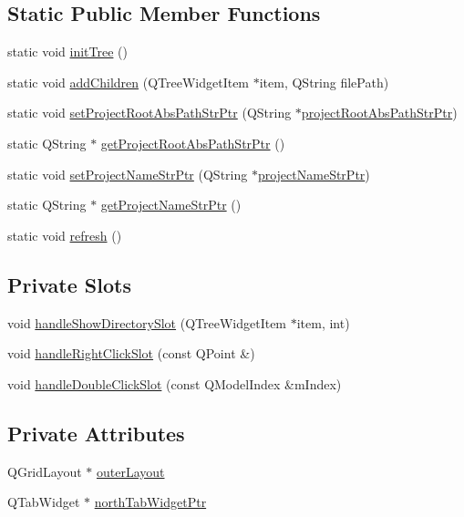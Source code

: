 \subsection*{Static Public Member Functions}
\begin{DoxyCompactItemize}
\item 
static void \hyperlink{class_file_tree_gui_a5d4df4a19da0183ccc254019f77097b1}{init\-Tree} ()
\item 
static void \hyperlink{class_file_tree_gui_ab3c2fd5311245c08624461ac4c7e120c}{add\-Children} (Q\-Tree\-Widget\-Item $\ast$item, Q\-String file\-Path)
\item 
static void \hyperlink{class_file_tree_gui_afe882583424429fcda9c4c2bc0ab71d4}{set\-Project\-Root\-Abs\-Path\-Str\-Ptr} (Q\-String $\ast$\hyperlink{class_file_tree_gui_a9ce991f8f95f583aa5fb1bec7a9bcd4c}{project\-Root\-Abs\-Path\-Str\-Ptr})
\item 
static Q\-String $\ast$ \hyperlink{class_file_tree_gui_a21607e8cda6732997d5148581017a9b8}{get\-Project\-Root\-Abs\-Path\-Str\-Ptr} ()
\item 
static void \hyperlink{class_file_tree_gui_aa73dfe7db7a325be6b082b771a60dbfd}{set\-Project\-Name\-Str\-Ptr} (Q\-String $\ast$\hyperlink{class_file_tree_gui_a51591bd328287179146de851e7263b70}{project\-Name\-Str\-Ptr})
\item 
static Q\-String $\ast$ \hyperlink{class_file_tree_gui_ab1e576f0ea1cc690f3517cf8aa297884}{get\-Project\-Name\-Str\-Ptr} ()
\item 
static void \hyperlink{class_file_tree_gui_ac2c3399b5cb85da5cd1c119b61c674c0}{refresh} ()
\end{DoxyCompactItemize}
\subsection*{Private Slots}
\begin{DoxyCompactItemize}
\item 
void \hyperlink{class_file_tree_gui_aa8110a99d6bab64818b7f87024382b2a}{handle\-Show\-Directory\-Slot} (Q\-Tree\-Widget\-Item $\ast$item, int)
\item 
void \hyperlink{class_file_tree_gui_a9d726b5258284de8f9dc10cddddbdc87}{handle\-Right\-Click\-Slot} (const Q\-Point \&)
\item 
void \hyperlink{class_file_tree_gui_ad62c632ea816c18c65aebfd194c878f1}{handle\-Double\-Click\-Slot} (const Q\-Model\-Index \&m\-Index)
\end{DoxyCompactItemize}
\subsection*{Private Attributes}
\begin{DoxyCompactItemize}
\item 
Q\-Grid\-Layout $\ast$ \hyperlink{class_file_tree_gui_aaf8b63a4775b1d46d635cdaef94b979a}{outer\-Layout}
\item 
Q\-Tab\-Widget $\ast$ \hyperlink{class_file_tree_gui_ae44c6d73787d55eae9bed8e16ff9f34a}{north\-Tab\-Widget\-Ptr}
\end{DoxyCompactItemize}
